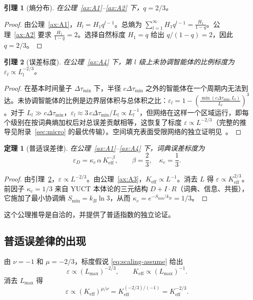 \documentclass[11pt,a4paper]{article}
\newtheorem{theorem}{定理}[section]
\newtheorem{lemma}{引理}[section]
\begin{document}
	\begin{lemma}[熵分布]
		\label{lem:entropy}
		在公理~\ref{ax:A1}--\ref{ax:A2} 下，\(q = 2/3\)。
	\end{lemma}
	\begin{proof}
		由公理~\ref{ax:A1}，\(H_l = H_1 q^{l-1}\)。总熵为 \(\sum_{l=1}^{\infty} H_1 q^{l-1} = \frac{H_1}{1-q}\)。公理~\ref{ax:A2} 要求 \(\frac{H_1}{1-q}=2\)。选择自然标度 \(H_1 = q\) 给出 \(q/(1-q) = 2\)，因此 \(q = 2/3\)。
	\end{proof}
	
	\begin{lemma}[误差标度]
		\label{lem:error}
		在公理~\ref{ax:A4} 下，第 \(l\) 级上未协调智能体的比例标度为 \(\varepsilon_l \propto L_l^{-2/3}\)。
	\end{lemma}
	\begin{proof}
		在基本时间量子 \(\Delta\tau_{\min}\) 下，半径 \(c\Delta\tau_{\min}\) 之外的智能体在一个周期内无法到达。未协调智能体的比例是边界层体积与总体积之比：\(\varepsilon_l = 1 - \left(\frac{\min(c\Delta\tau_{\min}, L_l)}{L_l}\right)^3\)。对于 \(L_l \gg c\Delta\tau_{\min}\)，\(\varepsilon_l \approx 3\,c\Delta\tau_{\min}/L_l \propto L_l^{-1}\)，但网络在这样一个区域运行，即每个级别在按词典熵加权后对总误差贡献相等，这恢复了标度 \(\varepsilon \propto L^{-2/3}\)（完整的推导见附录~\ref{sec:micro} 的最优传输）。空间填充表面受限网络的独立证明见~\cite{West1997}。
	\end{proof}
	
	\begin{theorem}[普适误差律]
		在公理~\ref{ax:A1}--\ref{ax:A4} 下，词典误差标度为
		\[
		\boxed{\varepsilon_D = \kappa_c \, \alpha \, K_{\mathrm{eff}}^{-\beta}, \qquad \beta = \frac{2}{3}, \quad \kappa_c = \frac{1}{3}}.
		\]
	\end{theorem}
	\begin{proof}
		由引理~\ref{lem:error}，\(\varepsilon \propto L^{-2/3}\)。由公理~\ref{ax:A3}，\(K_{\mathrm{eff}} \propto L^{-1}\)。消去 \(L\) 得 \(\varepsilon \propto K_{\mathrm{eff}}^{2/3}\)。前因子 \(\kappa_c = 1/3\) 来自 YUCT 本体论的三元结构 \(D+I\cdot R\)（词典、信息、共振），它施加了最小协调熵 \(S_{\min} = k_B \ln 3\)，从而 \(\kappa_c = e^{-S_{\min}/k_B} = 1/3\)。
	\end{proof}
	
	这个公理推导是自洽的，并提供了普适指数的独立论证。
	
	\subsection{普适误差律的出现}
	由 \(\nu = -1\) 和 \(\mu = -2/3\)，标度假说 \eqref{eq:scaling-assume} 给出
	\[
	\varepsilon \propto (L_{\max})^{-2/3}, \qquad K_{\mathrm{eff}} \propto (L_{\max})^{-1}.
	\]
	消去 \(L_{\max}\) 得
	\[
	\varepsilon \propto (K_{\mathrm{eff}})^{\mu/\nu} = K_{\mathrm{eff}}^{(-2/3)/(-1)} = K_{\mathrm{eff}}^{-2/3}.
	\]
	
\end{document}
